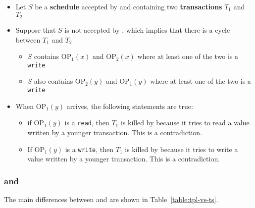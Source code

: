 \documentclass[english]{article}
\begin{document}
\begin{itemize}
  \item Let \(S\) be a \textbf{schedule} accepted by \TS and containing two \textbf{transactions} \(T_1\) and \(T_2\)
  \item Suppose that \(S\) is not accepted by \CSR, which implies that there is a cycle between \(T_1\) and \(T_2\)
        \begin{itemize}
          \item \(S\) contains \(\text{OP}_1(x)\) and \(\text{OP}_2(x)\) where at least one of the two is a \texttt{write}
          \item \(S\) also contains \(\text{OP}_2(y)\) and \(\text{OP}_1(y)\) where at least one of the two is a \texttt{write}
        \end{itemize}
  \item When \(\text{OP}_1(y)\) arrives, the following statements are true:
        \begin{itemize}
          \item if \(\text{OP}_1(y)\) is a \texttt{read}, then \(T_1\) is killed by \TS because it tries to read a value written by a younger transaction. This is a contradiction.
          \item If \(\text{OP}_1(y)\) is a \texttt{write}, then \(T_1\) is killed by \TS because it tries to write a value written by a younger transaction. This is a contradiction.
        \end{itemize}
\end{itemize}

\subsubsection{\TPL and \TS}

The main differences between \TPL and \TS are shown in Table~\ref{table:tpl-vs-ts}.

\begin{table}
  \centering
  \bigskip
  \caption{Differences between \TPL and \TS}
  \label{table:tpl-vs-ts}
  \bigskip
\end{table}
\end{document}
